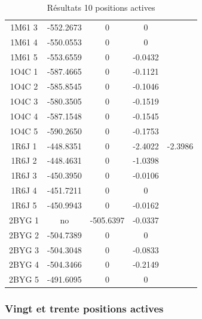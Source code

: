 \documentclass[a4paper,12pt]{book}
\begin{document}
\begin{table}[h]
\begin{tabular}{|c|c|c|c|c|}
        1M61 3 & -552.2673 & 0 & 0 & \\
        1M61 4 & -550.0553 & 0 & 0 & \\
        1M61 5 & -553.6559 & 0 & -0.0432 & \\
        1O4C 1 & -587.4665 & 0 & -0.1121 & \\
        1O4C 2 & -585.8545 & 0 & -0.1046 & \\
        1O4C 3 & -580.3505 & 0 & -0.1519 & \\
        1O4C 4 & -587.1548 & 0 & -0.1545 & \\
        1O4C 5 & -590.2650 & 0 & -0.1753 & \\
        1R6J 1 & -448.8351 & 0 & -2.4022 & -2.3986 \\
        1R6J 2 & -448.4631 & 0 & -1.0398 & \\
        1R6J 3 & -450.3950 & 0 & -0.0106 & \\
        1R6J 4 & -451.7211 & 0 & 0 & \\
        1R6J 5 & -450.9943 & 0 & -0.0162 & \\
        2BYG 1 & no & -505.6397 & -0.0337 & \\
        2BYG 2 & -504.7389 & 0 & 0 & \\
        2BYG 3 & -504.3048 & 0 & -0.0833 & \\
        2BYG 4 & -504.3466 & 0 & -0.2149 & \\
        2BYG 5 & -491.6095 & 0 & 0 & \\
        
        \hline


 \end{tabular}      
 \caption{Résultats 10 positions actives }
 \label{tab_echec2BYG__1}      
\end{table}


   \subsubsection{ Vingt et trente positions actives}
\end{document}
